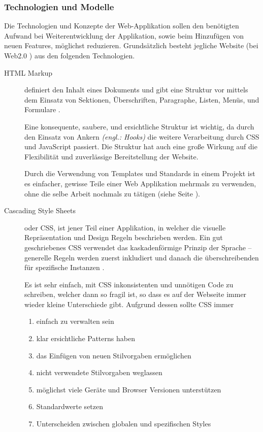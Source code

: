 \subsubsection{Technologien und Modelle}

Die Technologien und Konzepte der Web-Applikation sollen den benötigten Aufwand bei Weiterentwicklung der Applikation, sowie beim Hinzufügen von neuen Features, möglichst reduzieren. Grundsätzlich besteht jegliche Website (bei Web2.0 \cite{MELD.CH3-web-app.web2}) aus den folgenden Technologien.

\begin{description}
\item[HTML Markup \newline] \label{html} definiert den Inhalt eines Dokuments und gibt eine Struktur vor mittels dem Einsatz von Sektionen, Überschriften, Paragraphe, Listen, Menüs, und Formulare \cite{MELD.CH3-web-app.html}.

Eine konsequente, saubere, und ersichtliche Struktur ist wichtig, da durch den Einsatz von Ankern \textit{(engl.: Hooks)} die weitere Verarbeitung durch CSS und JavaScript passiert. Die Struktur hat auch eine große Wirkung auf die Flexibilität und zuverlässige Bereitstellung der Website.

Durch die Verwendung von Templates und Standards in einem Projekt ist es einfacher, gewisse Teile einer Web Applikation mehrmals zu verwenden, ohne die selbe Arbeit nochmals zu tätigen (siehe Seite \pageref{subsec:jsframeworks}).

\item[Cascading Style Sheets\newline] oder CSS, ist jener Teil einer Applikation, in welcher die visuelle Repräsentation und Design Regeln beschrieben werden. Ein gut geschriebenes CSS verwendet das kaskadenförmige Prinzip der Sprache – generelle Regeln werden zuerst inkludiert und danach die überschreibenden für spezifische Instanzen \cite{MELD.CH3-web-app.css}.

Es ist sehr einfach, mit CSS inkonsistenten und unnötigen Code zu schreiben, welcher dann so fragil ist, so dass es auf der Webseite immer wieder kleine Unterschiede gibt. Aufgrund dessen sollte CSS immer \cite{MELD.CH3-web-app.css2}
\begin{enumerate}
\item einfach zu verwalten sein
\item klar ersichtliche Patterns haben
\item das Einfügen von neuen Stilvorgaben ermöglichen
\item nicht verwendete Stilvorgaben weglassen
\item möglichst viele Geräte und Browser Versionen unterstützen
\item Standardwerte setzen
\item Unterscheiden zwischen globalen und spezifischen Styles
\end{enumerate}


\end{description}

